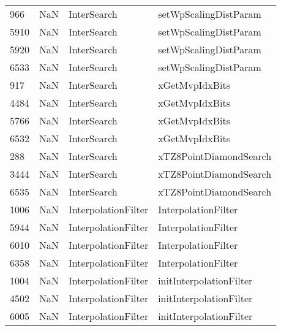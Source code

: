 \begin{tabular}{llll}
966  &                   NaN &                InterSearch &                     setWpScalingDistParam \\
5910 &                   NaN &                InterSearch &                     setWpScalingDistParam \\
5920 &                   NaN &                InterSearch &                     setWpScalingDistParam \\
6533 &                   NaN &                InterSearch &                     setWpScalingDistParam \\
917  &                   NaN &                InterSearch &                            xGetMvpIdxBits \\
4484 &                   NaN &                InterSearch &                            xGetMvpIdxBits \\
5766 &                   NaN &                InterSearch &                            xGetMvpIdxBits \\
6532 &                   NaN &                InterSearch &                            xGetMvpIdxBits \\
288  &                   NaN &                InterSearch &                    xTZ8PointDiamondSearch \\
3444 &                   NaN &                InterSearch &                    xTZ8PointDiamondSearch \\
6535 &                   NaN &                InterSearch &                    xTZ8PointDiamondSearch \\
1006 &                   NaN &        InterpolationFilter &                       InterpolationFilter \\
5944 &                   NaN &        InterpolationFilter &                       InterpolationFilter \\
6010 &                   NaN &        InterpolationFilter &                       InterpolationFilter \\
6358 &                   NaN &        InterpolationFilter &                       InterpolationFilter \\
1004 &                   NaN &        InterpolationFilter &                   initInterpolationFilter \\
4502 &                   NaN &        InterpolationFilter &                   initInterpolationFilter \\
6005 &                   NaN &        InterpolationFilter &                   initInterpolationFilter \\

\end{tabular}
